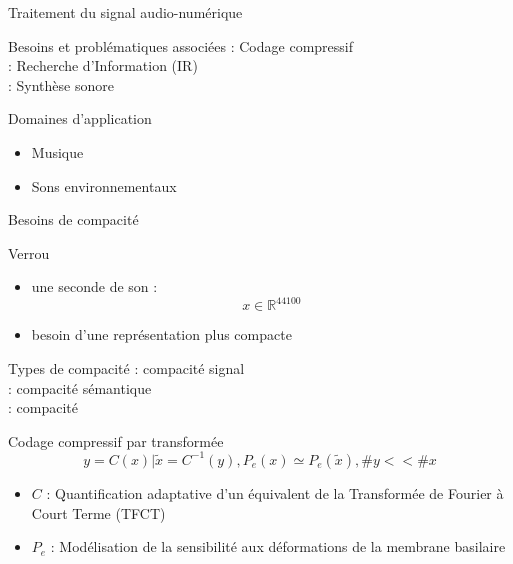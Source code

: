 \begin{frame}{Traitement du signal audio-numérique}
\begin{block}{Besoins et problématiques associées}
: Codage compressif \\
: Recherche d'Information (IR) \\
: Synthèse sonore
\end{block}
\begin{block}{Domaines d'application}
\begin{itemize}
\item Musique
\item Sons environnementaux
\end{itemize}
\end{block}
\end{frame}


\begin{frame}{Besoins de compacité}
\begin{block}{Verrou}
\begin{itemize}
\item une seconde de son : $$ x \in \mathbb{R}^{44100}$$
\item besoin d'une représentation plus \alert{compacte}
\end{itemize}
\end{block}
\begin{block}{Types de compacité}
: compacité signal \\ %
: compacité sémantique \\ %
: compacité \alert{\og}  \alert{\fg} \\ %
\end{block}
\end{frame}

\begin{frame}{Codage compressif par transformée}
$$y = C(x) | \tilde{x} = C^{-1}(y), P_e(x) \simeq P_e(\tilde{x}), \#y << \#x$$
\begin{itemize}
\item $C$ : Quantification adaptative d'un équivalent de la Transformée de Fourier à Court Terme (TFCT)
\item $P_e$ : Modélisation de la sensibilité aux déformations de la membrane basilaire
\end{itemize}
\end{frame}

